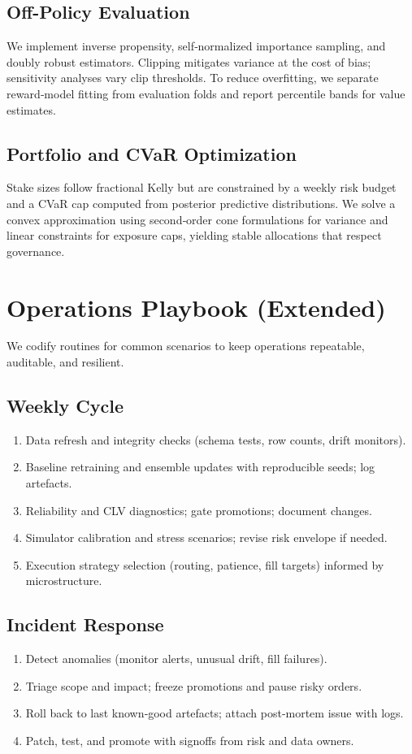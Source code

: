 \documentclass[12pt]{report}  %
\numberwithin{equation}{section}
\theoremstyle{plain}
\theoremstyle{definition}
\theoremstyle{remark}
\begin{document}
\section{Off-Policy Evaluation}
We implement inverse propensity, self‑normalized importance sampling, and doubly robust estimators. Clipping mitigates variance at the cost of bias; sensitivity analyses vary clip thresholds. To reduce overfitting, we separate reward‑model fitting from evaluation folds and report percentile bands for value estimates.

\section{Portfolio and CVaR Optimization}
Stake sizes follow fractional Kelly but are constrained by a weekly risk budget and a CVaR cap computed from posterior predictive distributions. We solve a convex approximation using second‑order cone formulations for variance and linear constraints for exposure caps, yielding stable allocations that respect governance.

\chapter{Operations Playbook (Extended)}
We codify routines for common scenarios to keep operations repeatable, auditable, and resilient.

\section{Weekly Cycle}
\begin{enumerate}
  \item Data refresh and integrity checks (schema tests, row counts, drift monitors).
  \item Baseline retraining and ensemble updates with reproducible seeds; log artefacts.
  \item Reliability and CLV diagnostics; gate promotions; document changes.
  \item Simulator calibration and stress scenarios; revise risk envelope if needed.
  \item Execution strategy selection (routing, patience, fill targets) informed by microstructure.
\end{enumerate}

\section{Incident Response}
\begin{enumerate}
  \item Detect anomalies (monitor alerts, unusual drift, fill failures).
  \item Triage scope and impact; freeze promotions and pause risky orders.
  \item Roll back to last known‑good artefacts; attach post‑mortem issue with logs.
  \item Patch, test, and promote with signoffs from risk and data owners.
\end{enumerate}
\end{document}
